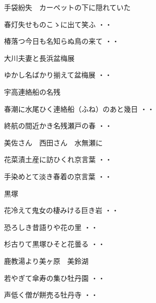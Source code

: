 \vspace{0.6cm}
手袋紛失　カーペットの下に隠れていた
\begin{shiika}春灯失せものこゝに出て笑ふ
\hfill{・・}\end{shiika}
\vspace{0.6cm}
\begin{shiika}椿落つ今日も名知らぬ鳥の来て
\hfill{・・}\end{shiika}
\vspace{0.6cm}
大川夫妻と長浜盆梅展
\begin{shiika}ゆかし名ばかり揃えて盆梅展
\hfill{・・}\end{shiika}
\vspace{0.6cm}
宇高連絡船の名残
\begin{shiika}春潮に水尾ひく連絡船（ふね）のあと幾日
\hfill{・・}\end{shiika}
\begin{shiika}終航の間近かき名残瀬戸の春
\hfill{・・}\end{shiika}
\vspace{0.6cm}
美佐さん　西田さん　水無瀬に
\begin{shiika}花菜漬土産に訪ひくれ京言葉
\hfill{・・}\end{shiika}
\begin{shiika}手染めとて淡き春着の京言葉
\hfill{・・}\end{shiika}
\vspace{0.6cm}
黒塚
\begin{shiika}花冷えて鬼女の棲みける巨き岩
\hfill{・・}\end{shiika}
\begin{shiika}恐ろしき昔語りや花の里
\hfill{・・}\end{shiika}
\begin{shiika}杉古りて黒塚ひそと花曇る
\hfill{・・}\end{shiika}
\vspace{0.6cm}
鹿教湯より美ヶ原　美鈴湖
\begin{shiika}若やぎて傘寿の集ひ牡丹園
\hfill{・・}\end{shiika}
\begin{shiika}声低く僧が餅売る牡丹寺
\hfill{・・}\end{shiika}
